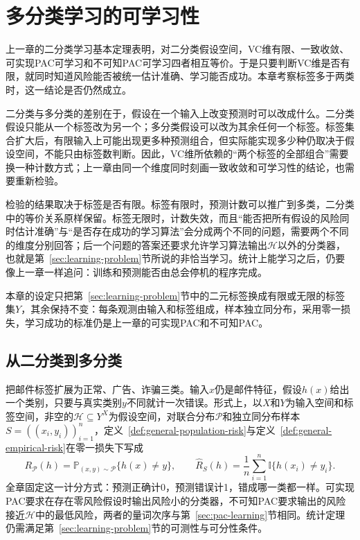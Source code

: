 \chapter{多分类学习的可学习性}
\label{chap:multiclass-learnability}

上一章的二分类学习基本定理表明，对二分类假设空间，VC维有限、一致收敛、可实现PAC可学习和不可知PAC可学习四者相互等价。于是只要判断VC维是否有限，就同时知道风险能否被统一估计准确、学习能否成功。本章考察标签多于两类时，这一结论是否仍然成立。

二分类与多分类的差别在于，假设在一个输入上改变预测时可以改成什么。二分类假设只能从一个标签改为另一个；多分类假设可以改为其余任何一个标签。标签集合扩大后，有限输入上可能出现更多种预测组合，但实际能实现多少种仍取决于假设空间，不能只由标签数判断。因此，VC维所依赖的“两个标签的全部组合”需要换一种计数方式；上一章由同一个维度同时刻画一致收敛和可学习性的结论，也需要重新检验。

检验的结果取决于标签是否有限。标签有限时，预测计数可以推广到多类，二分类中的等价关系原样保留。标签无限时，计数失效，而且“能否把所有假设的风险同时估计准确”与“是否存在成功的学习算法”会分成两个不同的问题，需要两个不同的维度分别回答；后一个问题的答案还要求允许学习算法输出$\mathcal H$以外的分类器，也就是第~\ref{sec:learning-problem}节所说的非恰当学习。统计上能学习之后，仍要像上一章一样追问：训练和预测能否由总会停机的程序完成。

本章的设定只把第~\ref{sec:learning-problem}节中的二元标签换成有限或无限的标签集$Y$，其余保持不变：每条观测由输入和标签组成，样本独立同分布，采用零一损失，学习成功的标准仍是上一章的可实现PAC和不可知PAC。

\section{从二分类到多分类}
\label{sec:multiclass-setting}

把邮件标签扩展为正常、广告、诈骗三类。输入$x$仍是邮件特征，假设$h(x)$给出一个类别，只要与真实类别$y$不同就计一次错误。形式上，以$X$和$Y$为输入空间和标签空间，非空的$\mathcal H\subseteq Y^X$为假设空间，对联合分布$\mathcal P$和独立同分布样本$S=((x_i,y_i))_{i=1}^n$，定义~\ref{def:general-population-risk}与定义~\ref{def:general-empirical-risk}在零一损失下写成
\begin{equation}
 R_{\mathcal P}(h)=\mathbb P_{(x,y)\sim\mathcal P}\{h(x)\neq y\},\qquad
 \hat R_S(h)=\frac1n\sum_{i=1}^n\mathbb I\{h(x_i)\neq y_i\}.
 \label{eq:multiclass-risk}
\end{equation}
全章固定这一计分方式：预测正确计0，预测错误计1，错成哪一类都一样。可实现PAC要求在存在零风险假设时输出风险小的分类器，不可知PAC要求输出的风险接近$\mathcal H$中的最低风险，两者的量词次序与第~\ref{sec:pac-learning}节相同。统计定理仍需满足第~\ref{sec:learning-problem}节的可测性与可分性条件。

